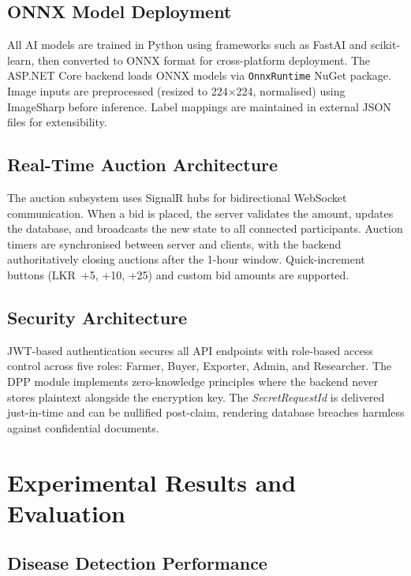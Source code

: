 \documentclass[10pt, conference]{IEEEtran}
\begin{document}
\subsection{ONNX Model Deployment}

All AI models are trained in Python using frameworks such as FastAI
and scikit-learn, then converted to ONNX format for cross-platform
deployment. The ASP.NET Core backend loads ONNX models via
\texttt{OnnxRuntime} NuGet package. Image inputs are preprocessed
(resized to 224${\times}$224, normalised) using ImageSharp before
inference. Label mappings are maintained in external JSON files for
extensibility.

\subsection{Real-Time Auction Architecture}

The auction subsystem uses SignalR hubs for bidirectional WebSocket
communication. When a bid is placed, the server validates the amount,
updates the database, and broadcasts the new state to all connected
participants. Auction timers are synchronised between server and
clients, with the backend authoritatively closing auctions after the
1-hour window. Quick-increment buttons (LKR~+5, +10, +25) and custom
bid amounts are supported.

\subsection{Security Architecture}

JWT-based authentication secures all API endpoints with role-based
access control across five roles: Farmer, Buyer, Exporter, Admin, and
Researcher. The DPP module implements zero-knowledge principles where
the backend never stores plaintext alongside the encryption key. The
\textit{SecretRequestId} is delivered just-in-time and can be
nullified post-claim, rendering database breaches harmless against
confidential documents.

\section{Experimental Results and Evaluation}

\subsection{Disease Detection Performance}
\end{document}
